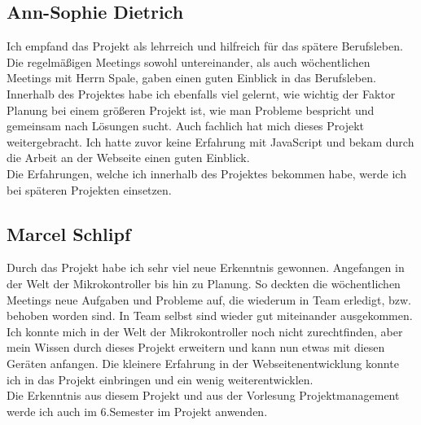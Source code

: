 \subsection*{Ann-Sophie Dietrich}
Ich empfand das Projekt als lehrreich und hilfreich für das spätere Berufsleben.\\
Die regelmäßigen Meetings sowohl untereinander, als auch 
wöchentlichen Meetings mit Herrn Spale, gaben einen guten Einblick in das Berufsleben.\\
Innerhalb des Projektes habe ich ebenfalls viel gelernt, wie wichtig der Faktor Planung 
bei einem größeren Projekt ist, wie man Probleme bespricht und gemeinsam nach Lösungen sucht.
Auch fachlich hat mich dieses Projekt weitergebracht. Ich hatte zuvor keine Erfahrung 
mit JavaScript und bekam durch die Arbeit an der Webseite einen guten Einblick.\\
Die Erfahrungen, welche ich innerhalb des Projektes bekommen habe, werde ich bei 
späteren Projekten einsetzen.

\subsection*{Marcel Schlipf}
Durch das Projekt habe ich sehr viel neue Erkenntnis gewonnen. Angefangen in der
Welt der Mikrokontroller bis hin zu Planung. So deckten die wöchentlichen
Meetings neue Aufgaben und Probleme auf, die wiederum in Team erledigt, bzw.
behoben worden sind. In Team selbst sind wieder gut miteinander ausgekommen.\\
Ich konnte mich in der Welt der Mikrokontroller noch nicht zurechtfinden, aber
mein Wissen durch dieses Projekt erweitern und kann nun etwas mit diesen Geräten
anfangen. Die kleinere Erfahrung in der Webseitenentwicklung konnte ich in das
Projekt einbringen und ein wenig weiterentwicklen.\\
Die Erkenntnis aus diesem Projekt und aus der Vorlesung Projektmanagement werde
ich auch im 6.Semester im Projekt anwenden.
